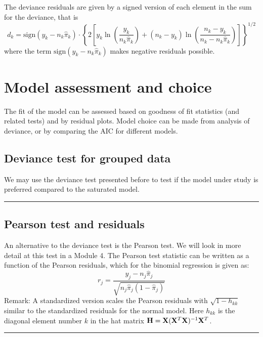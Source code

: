 \documentclass[
]{article}
\begin{document}
The deviance residuals are given by a signed version of each element in
the sum for the deviance, that is
\[d_k=\text{sign}(y_k-n_k\hat{\pi}_k)\cdot \left\{ 
2[y_k\ln(\frac{y_k}{n_k\hat{\pi}_k})+(n_k-y_k)\ln(\frac{n_k-y_k}{n_k-n_k\hat{\pi}_k})]\right\}^{1/2}\]
where the term \(\text{sign}(y_k-n_k\hat{\pi}_k)\) makes negative
residuals possible.

\hypertarget{model-assessment-and-choice}{%
\section{Model assessment and
choice}\label{model-assessment-and-choice}}

The fit of the model can be assessed based on goodness of fit statistics
(and related tests) and by residual plots. Model choice can be made from
analysis of deviance, or by comparing the AIC for different models.

\hypertarget{deviance-test-for-grouped-data}{%
\subsection{Deviance test for grouped
data}\label{deviance-test-for-grouped-data}}

We may use the deviance test presented before to test if the model under
study is preferred compared to the saturated model.

\begin{center}\rule{0.5\linewidth}{0.5pt}\end{center}

\hypertarget{pearson-test-and-residuals}{%
\subsection{Pearson test and
residuals}\label{pearson-test-and-residuals}}

An alternative to the deviance test is the Pearson test. We will look in
more detail at this test in a Module 4. The Pearson test statistic can
be written as a function of the Pearson residuals, which for the
binomial regression is given as:
\[ r_{j}=\frac{y_j-n_j\hat{\pi}_j}{\sqrt{n_j \hat{\pi}_j(1-\hat{\pi}_j)}}\]
Remark: A standardized version scales the Pearson residuals with
\(\sqrt{1-h_{kk}}\) similar to the standardized residuals for the normal
model. Here \(h_{kk}\) is the diagonal element number \(k\) in the hat
matrix \({\bf H}={\bf X}({\bf X}^T{\bf X})^{-1}{\bf X}^T\).

\begin{center}\rule{0.5\linewidth}{0.5pt}\end{center}
\end{document}
